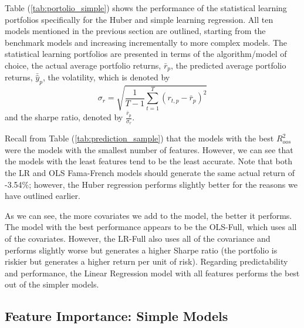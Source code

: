Table (\ref{tab:portolio_simple}) shows the performance of the statistical learning portfolios specifically for the Huber and simple learning regression. All ten models mentioned in the previous section are outlined, starting from the benchmark models and increasing incrementally to more complex models. The statistical learning portfolios are presented in terms of the algorithm/model of choice, the actual average portfolio returns, $\bar{r}_p$, the predicted average portfolio returns, $\bar{\hat{y}}_p$, the volatility, which is denoted by
\begin{equation}\label{eq:port_vol}
	\sigma_r=\sqrt{\frac{1}{T-1}\sum_{t=1}^{T}\left(r_{t,p}-\bar{r}_p\right)^2}
\end{equation}
and the sharpe ratio, denoted by $\tfrac{\bar{r}_p}{\sigma_r}$.

Recall from Table (\ref{tab:prediction_sample}) that the models with the best $R^2_{oos}$ were the models with the smallest number of features. However, we can see that the models with the least features tend to be the least accurate. Note that both the LR and OLS Fama-French models should generate the same actual return of -3.54\%; however, the Huber regression performs slightly better for the reasons we have outlined earlier.

As we can see, the more covariates we add to the model, the better it performs. The model with the best performance appears to be the OLS-Full, which uses all of the covariates. However, the LR-Full also uses all of the covariance and performs slightly worse but generates a higher Sharpe ratio (the portfolio is riskier but generates a higher return per unit of risk). Regarding predictability and performance, the Linear Regression model with all features performs the best out of the simpler models.
\subsection{Feature Importance: Simple Models}

